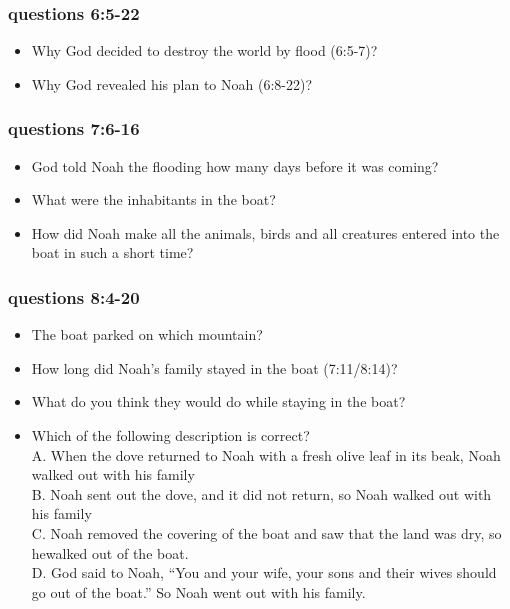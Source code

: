 \newpage
\subsubsection{questions 6:5-22}
\begin{itemize}
\item Why God decided to destroy the world by flood (6:5-7)?
\item Why God revealed his plan to Noah (6:8-22)?
\end{itemize}

\subsubsection{questions 7:6-16}
\begin{itemize}
\item God told Noah the flooding how many days before it was coming?
\item What were the inhabitants in the boat? 
\item How did Noah make all the animals, birds and all creatures  entered into the boat in such a short time?
\end{itemize}

\subsubsection{questions 8:4-20}
\begin{itemize}
\item The boat parked on which mountain?
\item How long did Noah's family stayed in the boat (7:11/8:14)?
\item What do you think they would do while staying in the boat?
\item Which of the following description is correct?\\
A. When the dove returned to Noah with a fresh olive leaf in its beak, Noah walked out with his family\\
B. Noah sent out the dove, and it did not return, so Noah walked out with his family\\
C. Noah removed the covering of the boat and saw that the land was dry, so hewalked out of the boat.\\
D. God said to Noah, “You and your wife, your sons and their wives should go out of the boat.” So Noah went out with his family.
\end{itemize}

